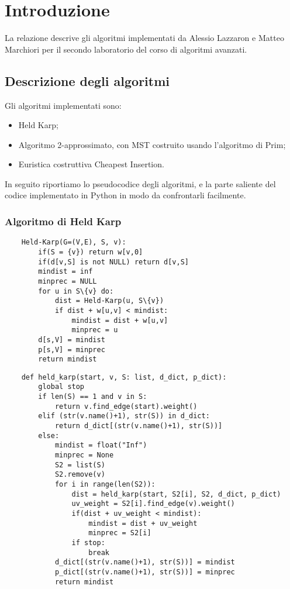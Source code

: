 \chapter{Introduzione\label{sec:introduzione}}
\noindent La relazione descrive gli algoritmi implementati da Alessio Lazzaron e Matteo Marchiori per il secondo laboratorio del corso di algoritmi avanzati.

\section{Descrizione degli algoritmi\label{sec:descrizione}}
Gli algoritmi implementati sono:
\begin{itemize}
    \item Held Karp;
    \item Algoritmo 2-approssimato, con MST costruito usando l'algoritmo di Prim;
    \item Euristica costruttiva Cheapest Insertion.
\end{itemize}

In seguito riportiamo lo pseudocodice degli algoritmi, e la parte saliente del codice implementato in Python in modo da confrontarli facilmente.

\subsection{Algoritmo di Held Karp\label{sec:hp}}
\begin{verbatim}
    Held-Karp(G=(V,E), S, v):
        if(S = {v}) return w[v,0]
        if(d[v,S] is not NULL) return d[v,S]
        mindist = inf
        minprec = NULL
        for u in S\{v} do:
            dist = Held-Karp(u, S\{v})
            if dist + w[u,v] < mindist:
                mindist = dist + w[u,v]
                minprec = u
        d[s,V] = mindist
        p[s,V] = minprec
        return mindist        
\end{verbatim}

\clearpage

\begin{verbatim}
    def held_karp(start, v, S: list, d_dict, p_dict):
        global stop
        if len(S) == 1 and v in S:
            return v.find_edge(start).weight()
        elif (str(v.name()+1), str(S)) in d_dict:
            return d_dict[(str(v.name()+1), str(S))]
        else:
            mindist = float("Inf")
            minprec = None
            S2 = list(S)
            S2.remove(v)
            for i in range(len(S2)):
                dist = held_karp(start, S2[i], S2, d_dict, p_dict)
                uv_weight = S2[i].find_edge(v).weight()
                if(dist + uv_weight < mindist):
                    mindist = dist + uv_weight
                    minprec = S2[i]
                if stop:
                    break
            d_dict[(str(v.name()+1), str(S))] = mindist
            p_dict[(str(v.name()+1), str(S))] = minprec
            return mindist
\end{verbatim}

